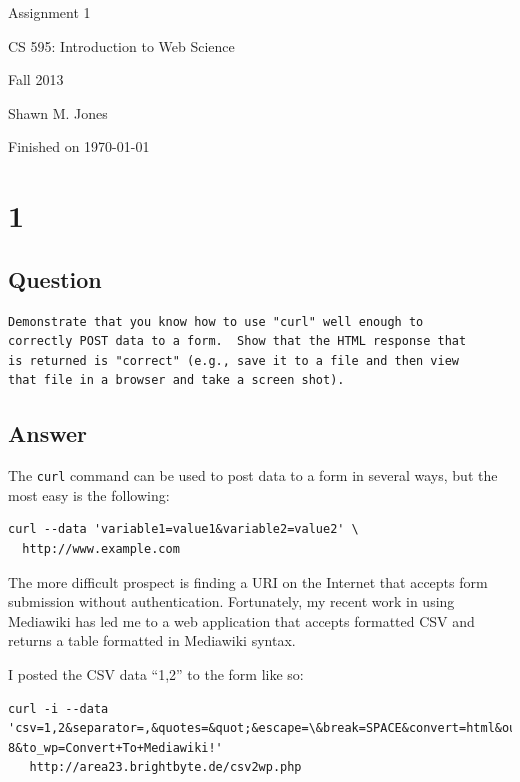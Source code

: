 \documentclass[letterpaper,11pt]{article}
\begin{document}
\begin{titlepage}

\begin{center}

\Huge{Assignment 1}

\Large{CS 595:  Introduction to Web Science}

\Large{Fall 2013}

\Large{Shawn M. Jones}

\Large Finished on \today

\end{center}

\end{titlepage}

\newpage
\section*{1}

\subsection*{Question}

\begin{verbatim}
Demonstrate that you know how to use "curl" well enough to
correctly POST data to a form.  Show that the HTML response that
is returned is "correct" (e.g., save it to a file and then view
that file in a browser and take a screen shot).
\end{verbatim}

\subsection*{Answer}

The \verb+curl+ command can be used to post data to a form in several ways, but the most easy is the following:
\begin{lstlisting}[frame=single]
curl --data 'variable1=value1&variable2=value2' \
  http://www.example.com
\end{lstlisting}

The more difficult prospect is finding a URI on the Internet that accepts form submission without authentication.  Fortunately, my recent work in using Mediawiki has led me to a web application that accepts formatted CSV and returns a table formatted in Mediawiki syntax.

I posted the CSV data ``1,2'' to the form like so:
\begin{lstlisting}[frame=single]
curl -i --data 'csv=1,2&separator=,&quotes=&quot;&escape=\&break=SPACE&convert=html&output_encoding=UTF-8&to_wp=Convert+To+Mediawiki!'
   http://area23.brightbyte.de/csv2wp.php
\end{lstlisting}
\end{document}
